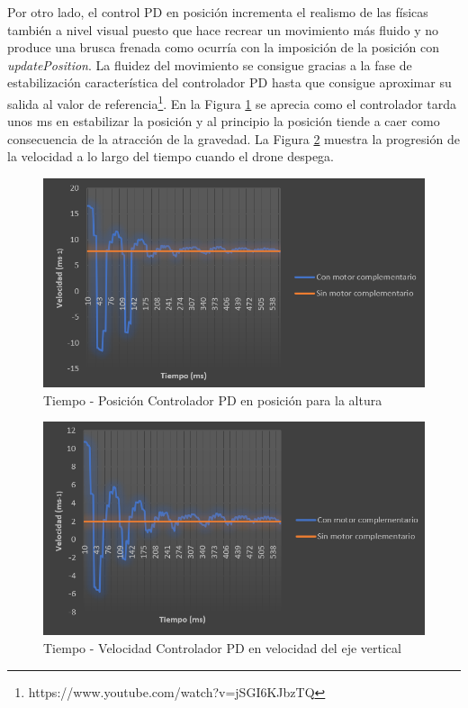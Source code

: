 Por otro lado, el control PD en posición incrementa el realismo de las físicas también a nivel visual puesto que hace recrear un movimiento más fluido y no produce una brusca frenada como ocurría con la imposición de la posición con \textit{updatePosition}. La fluidez del movimiento se consigue gracias a la fase de estabilización característica del controlador PD hasta que consigue aproximar su salida al valor de referencia\footnote{https://www.youtube.com/watch?v=jSGI6KJbzTQ}. En la Figura \ref{fig:pos-ejeY} se aprecia como el controlador tarda unos ms en estabilizar la posición y al principio la posición tiende a caer como consecuencia de la atracción de la gravedad. La Figura \ref{fig:vel-ejeY} muestra la progresión de la velocidad a lo largo del tiempo cuando el drone despega.

\begin{figure}[h!]
    \centering
    \includegraphics[scale=0.8]{PD_pos_Y.PNG}
    \caption{Tiempo - Posición Controlador PD en posición para la altura}
    \label{fig:pos-ejeY}
\end{figure}

\begin{figure}[h!]
    \centering
    \includegraphics[scale=0.8]{PD_vel_Y.PNG}
    \caption{Tiempo - Velocidad Controlador PD en velocidad del eje vertical}
    \label{fig:vel-ejeY}
\end{figure}

